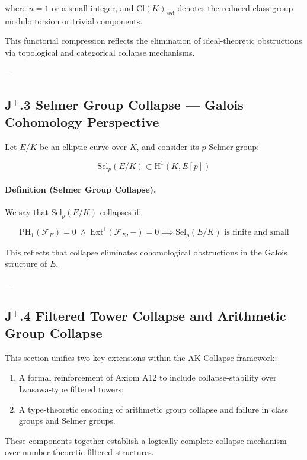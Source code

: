 \documentclass[11pt]{article}
\begin{document}
where \( n = 1 \) or a small integer, and \( \mathrm{Cl}(K)_{\mathrm{red}} \) denotes the reduced class group modulo torsion or trivial components.

This functorial compression reflects the elimination of ideal-theoretic obstructions via topological and categorical collapse mechanisms.

---

\subsection*{J$^{+}$.3 Selmer Group Collapse — Galois Cohomology Perspective}

Let $E/K$ be an elliptic curve over $K$, and consider its $p$-Selmer group:

\[
\mathrm{Sel}_p(E/K) \subset \mathrm{H}^1(K, E[p])
\]

\paragraph{Definition (Selmer Group Collapse).}

We say that $\mathrm{Sel}_p(E/K)$ collapses if:

\[
\mathrm{PH}_1(\mathcal{F}_E) = 0 \;\land\; \mathrm{Ext}^1(\mathcal{F}_E, -) = 0 \implies \mathrm{Sel}_p(E/K) \text{ is finite and small}
\]

This reflects that collapse eliminates cohomological obstructions in the Galois structure of $E$.

---

\subsection*{J$^{+}$.4 Filtered Tower Collapse and Arithmetic Group Collapse}
\label{sec:jplus4}

This section unifies two key extensions within the AK Collapse framework:

\begin{enumerate}
  \item A formal reinforcement of Axiom A12 to include collapse-stability over Iwasawa-type filtered towers;
  \item A type-theoretic encoding of arithmetic group collapse and failure in class groups and Selmer groups.
\end{enumerate}

These components together establish a logically complete collapse mechanism over number-theoretic filtered structures.
\end{document}
